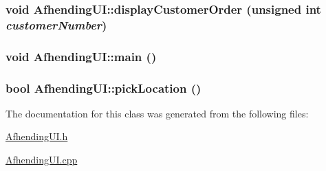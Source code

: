 \hypertarget{class_afhending_u_i_537283a7f7677384872f66c6b1dc4491}{
\subsubsection[displayCustomerOrder]{\setlength{\rightskip}{0pt plus 5cm}void Afhending\-UI::display\-Customer\-Order (unsigned int {\em customer\-Number})}}
\label{class_afhending_u_i_537283a7f7677384872f66c6b1dc4491}


\hypertarget{class_afhending_u_i_ea83b916b3f52eec32ae6d54d59b4453}{
\subsubsection[main]{\setlength{\rightskip}{0pt plus 5cm}void Afhending\-UI::main ()}}
\label{class_afhending_u_i_ea83b916b3f52eec32ae6d54d59b4453}


\hypertarget{class_afhending_u_i_74d0d6b7d7493e8a9703bc8fbeb79f2e}{
\subsubsection[pickLocation]{\setlength{\rightskip}{0pt plus 5cm}bool Afhending\-UI::pick\-Location ()}}
\label{class_afhending_u_i_74d0d6b7d7493e8a9703bc8fbeb79f2e}




The documentation for this class was generated from the following files:\begin{CompactItemize}
\item 
\hyperlink{_afhending_u_i_8h}{Afhending\-UI.h}\item 
\hyperlink{_afhending_u_i_8cpp}{Afhending\-UI.cpp}\end{CompactItemize}
